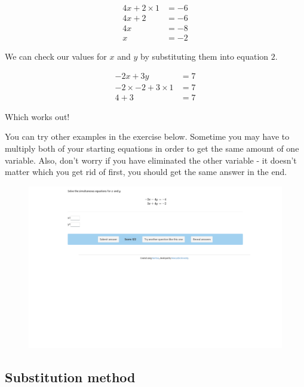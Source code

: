 \documentclass[
  a4paper,
]{scrbook}
\begin{document}
\[
\begin{aligned}
4x + 2 \times 1 &= -6 \\
4x + 2 &= -6 \\
4x &= -8 \\
x &= -2
\end{aligned}
\]

We can check our values for \(x\) and \(y\) by substituting them into
equation \(2\).

\[
\begin{aligned}
-2x + 3y &= 7 \\
-2 \times -2 + 3 \times 1 &= 7 \\
4 + 3 &= 7
\end{aligned}
\]

Which works out!

You can try other examples in the exercise below. Sometime you may have
to multiply both of your starting equations in order to get the same
amount of one variable. Also, don't worry if you have eliminated the
other variable - it doesn't matter which you get rid of first, you
should get the same answer in the end.

\begin{figure}

{\centering 

\href{https://numbas.mathcentre.ac.uk/question/104646/simultaneous-equations-linear-equations-with-integer-solutions/embed/?token=22ea59f8-3c89-478a-acd8-d114edcba808}{\includegraphics{./05-solving_equations_files/figure-pdf/unnamed-chunk-3-1.png}}

}

\end{figure}

\hypertarget{substitution-method}{%
\subsection{Substitution method}\label{substitution-method}}
\end{document}
